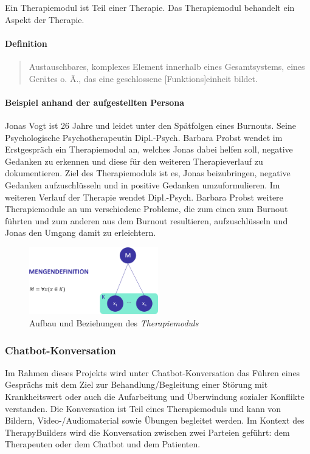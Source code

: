 Ein Therapiemodul ist Teil einer Therapie. Das Therapiemodul behandelt ein Aspekt der Therapie.

\paragraph{Definition}
\begin{quote}
Austauschbares, komplexes Element innerhalb eines Gesamtsystems, eines Gerätes o. Ä., das eine geschlossene [Funktions]einheit bildet. \cite{DudenMod70:online}
\end{quote}

\paragraph{Beispiel anhand der aufgestellten Persona}
Jonas Vogt ist 26 Jahre und leidet unter den Spätfolgen eines Burnouts. Seine Psychologische Psychotherapeutin Dipl.-Psych. Barbara Probst wendet im Erstgespräch ein Therapiemodul an, welches Jonas dabei helfen soll, negative Gedanken zu erkennen und diese für den weiteren Therapieverlauf zu dokumentieren. Ziel des Therapiemoduls ist es, Jonas beizubringen, negative Gedanken aufzuschlüsseln und in positive Gedanken umzuformulieren. Im weiteren Verlauf der Therapie wendet Dipl.-Psych. Barbara Probst weitere Therapiemodule an um verschiedene Probleme, die zum einen zum Burnout führten und zum anderen aus dem Burnout resultieren, aufzuschlüsseln und Jonas den Umgang damit zu erleichtern.

\begin{figure}[h]
\centering
\includegraphics[width=0.5\textwidth]{pictures/moduldef}
\caption{Aufbau und Beziehungen des \emph{Therapiemoduls}}
\label{moduldef}
\end{figure}

\subsubsection{Chatbot-Konversation}
Im Rahmen dieses Projekts wird unter Chatbot-Konversation das Führen  eines Gesprächs mit dem Ziel zur Behandlung/Begleitung einer Störung mit Krankheitswert oder auch die Aufarbeitung und Überwindung sozialer Konflikte verstanden. Die Konversation ist Teil eines Therapiemoduls und kann von Bildern, Video-/Audiomaterial sowie Übungen begleitet werden. Im Kontext des TherapyBuilders wird die Konversation zwischen zwei Parteien geführt: dem Therapeuten oder dem Chatbot und dem Patienten.

